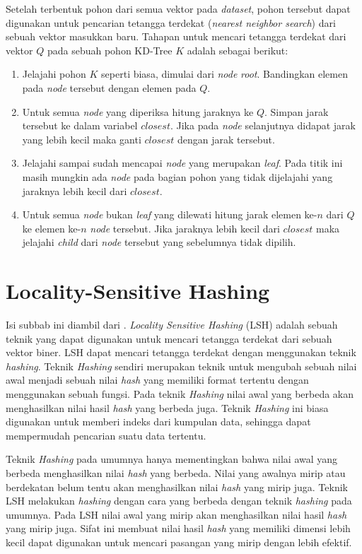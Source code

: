 Setelah terbentuk pohon dari semua vektor pada \textit{dataset}, pohon tersebut dapat digunakan untuk pencarian tetangga terdekat (\textit{nearest neighbor search}) dari sebuah vektor masukkan baru. Tahapan untuk mencari tetangga terdekat dari vektor $Q$ pada sebuah pohon KD-Tree $K$ adalah sebagai berikut:
\begin{enumerate}
	\item Jelajahi pohon $K$ seperti biasa, dimulai dari \textit{node} \textit{root}. Bandingkan elemen pada \textit{node} tersebut dengan elemen pada $Q$. 
	\item Untuk semua \textit{node} yang diperiksa hitung jaraknya ke $Q$. Simpan jarak tersebut ke dalam variabel $closest$. Jika pada \textit{node} selanjutnya didapat jarak yang lebih kecil maka ganti $closest$ dengan jarak tersebut.
	\item Jelajahi sampai sudah mencapai \textit{node} yang merupakan \textit{leaf}. Pada titik ini masih mungkin ada \textit{node} pada bagian pohon yang tidak dijelajahi yang jaraknya lebih kecil dari $closest$.
	\item Untuk semua \textit{node} bukan \textit{leaf} yang dilewati hitung jarak elemen ke-$n$ dari $Q$ ke elemen ke-$n$ \textit{node} tersebut. Jika jaraknya lebih kecil dari $closest$ maka jelajahi \textit{child} dari \textit{node} tersebut yang sebelumnya tidak dipilih.
\end{enumerate}

\section{Locality-Sensitive Hashing}
Isi subbab ini diambil dari \cite{anand2011mining}. \textit{Locality Sensitive Hashing} (LSH) adalah sebuah teknik yang dapat digunakan untuk mencari tetangga terdekat dari sebuah vektor biner. LSH dapat mencari tetangga terdekat dengan menggunakan teknik \textit{hashing}. Teknik \textit{Hashing} sendiri merupakan teknik untuk mengubah sebuah nilai awal menjadi sebuah nilai \textit{hash} yang memiliki format tertentu dengan menggunakan sebuah fungsi. Pada teknik \textit{Hashing} nilai awal yang berbeda akan menghasilkan nilai hasil \textit{hash} yang berbeda juga. Teknik \textit{Hashing} ini biasa digunakan untuk memberi indeks dari kumpulan data, sehingga dapat mempermudah pencarian suatu data tertentu.

Teknik \textit{Hashing} pada umumnya hanya mementingkan bahwa nilai awal yang berbeda menghasilkan nilai \textit{hash} yang berbeda. Nilai yang awalnya mirip atau berdekatan belum tentu akan menghasilkan nilai \textit{hash} yang mirip juga. Teknik LSH melakukan \textit{hashing} dengan cara yang berbeda dengan teknik \textit{hashing} pada umumnya. Pada LSH nilai awal yang mirip akan menghasilkan nilai hasil \textit{hash} yang mirip juga. Sifat ini membuat nilai hasil \textit{hash} yang memiliki dimensi lebih kecil dapat digunakan untuk mencari pasangan yang mirip dengan lebih efektif.

